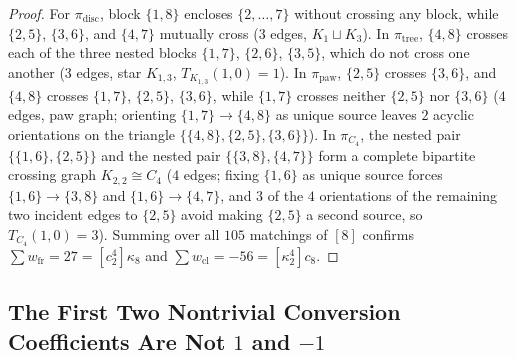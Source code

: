 \documentclass[11pt,a4paper]{article}
\theoremstyle{definition}
\theoremstyle{remark}
\newcommand{\cl}{\mathrm{cl}}
\newcommand{\fr}{\mathrm{fr}}
\begin{document}
\begin{proof}
For $\pi_{\mathrm{disc}}$, block $\{1,8\}$ encloses $\{2,\dots,7\}$ without crossing any block, while $\{2,5\}$, $\{3,6\}$, and $\{4,7\}$ mutually cross ($3$ edges, $K_1 \sqcup K_3$). In $\pi_{\mathrm{tree}}$, $\{4,8\}$ crosses each of the three nested blocks $\{1,7\}$, $\{2,6\}$, $\{3,5\}$, which do not cross one another ($3$ edges, star $K_{1,3}$, $T_{K_{1,3}}(1,0) = 1$). In $\pi_{\mathrm{paw}}$, $\{2,5\}$ crosses $\{3,6\}$, and $\{4,8\}$ crosses $\{1,7\}$, $\{2,5\}$, $\{3,6\}$, while $\{1,7\}$ crosses neither $\{2,5\}$ nor $\{3,6\}$ ($4$ edges, paw graph; orienting $\{1,7\} \to \{4,8\}$ as unique source leaves $2$ acyclic orientations on the triangle $\{\{4,8\},\{2,5\},\{3,6\}\}$). In $\pi_{C_4}$, the nested pair $\{\{1,6\},\{2,5\}\}$ and the nested pair $\{\{3,8\},\{4,7\}\}$ form a complete bipartite crossing graph $K_{2,2} \cong C_4$ ($4$ edges; fixing $\{1,6\}$ as unique source forces $\{1,6\} \to \{3,8\}$ and $\{1,6\} \to \{4,7\}$, and $3$ of the $4$ orientations of the remaining two incident edges to $\{2,5\}$ avoid making $\{2,5\}$ a second source, so $T_{C_4}(1,0) = 3$). Summing over all $105$ matchings of $[8]$ confirms $\sum w_{\fr} = 27 = [c_2^4]\kappa_8$ and $\sum w_{\cl} = -56 = [\kappa_2^4]c_8$.
\end{proof}

\subsection{The First Two Nontrivial Conversion Coefficients Are Not \texorpdfstring{$1$ and $-1$}{1 and -1}}
\end{document}
